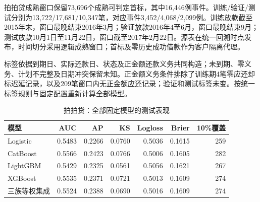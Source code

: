 拍拍贷成熟窗口保留73,696个成熟可判定首标，其中16,446例事件。训练/验证/测试分别为13,722/17,681/10,347笔，对应事件3,452/4,068/2,099例。训练放款截至2015年末，窗口最晚结束2016年3月；验证放款2016年4至6月，窗口最晚结束9月；测试放款10月1日至11月22日，窗口截至2017年2月22日。源表在统一回溯时点发布，时间切分采用逻辑成熟窗口；首标及零历史成功借款作为客户隔离代理。

标签依据到期日、实际还款日、状态及正金额还款义务共同构造；未到期、零义务、计划不完整及日期冲突保留未知。正金额义务条件排除了训练期4笔零应还却标迟延记录，以及209笔窗口内无正金额应还记录；验证和测试标签未变。按统一标签规则与固定配置重新计算全部模型。

\begin{table}[H]\centering\caption{拍拍贷：全部固定模型的测试表现}
\fontsize{9.1bp}{12.5bp}\selectfont
\begin{tabularx}{\linewidth}{@{}Yrrrrrr@{}}
\toprule
模型 & AUC & AP & KS & Logloss & Brier & 10\%覆盖 \\
\midrule
Logistic & 0.5483 & 0.2266 & 0.0760 & 0.5036 & 0.1615 & 259 \\
CatBoost & 0.5566 & 0.2423 & 0.0766 & 0.5006 & 0.1605 & 282 \\
LightGBM & 0.5429 & 0.2325 & 0.0561 & 0.5056 & 0.1621 & 267 \\
XGBoost & 0.5535 & 0.2371 & 0.0721 & 0.5013 & 0.1609 & 274 \\
三族等权集成 & 0.5524 & 0.2388 & 0.0690 & 0.5016 & 0.1609 & 274 \\
\bottomrule\end{tabularx}
\end{table}